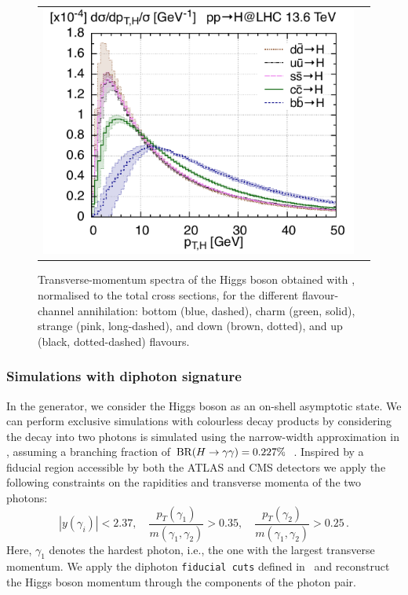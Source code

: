 \documentclass[11pt,a4paper]{article}
\begin{document}
\begin{figure}[t!]
\begin{center}
\begin{tabular}{cc}
\includegraphics[width=.52\textwidth, page=1]{plots/5fs/light/ptHzoom_qqH.pdf}
\end{tabular}
\vspace*{1ex}
\caption{Transverse-momentum spectra of the Higgs boson obtained with \minnlo{}, normalised to the total cross sections, for the different flavour-channel annihilation: bottom (blue, dashed), charm (green, solid), strange (pink, long-dashed), and down (brown, dotted), and  up (black, dotted-dashed) flavours.
\label{fig:lightpTHzoom}}
\end{center}
\end{figure}

\subsubsection{Simulations with diphoton signature}
In the \POWHEG{} generator, we consider the Higgs boson as an on-shell asymptotic state. We can perform exclusive simulations with colourless decay products by considering the decay into two photons is simulated using the narrow-width approximation in , assuming a branching fraction of \({\rm BR}(H \to \gamma\gamma) = 0.227\%\)~\cite{LHCHiggsCrossSectionWorkingGroup:2016ypw}. Inspired by a fiducial region accessible by both the ATLAS and CMS detectors we apply the following constraints on the rapidities and transverse momenta of the two photons:
\begin{equation}
|y(\gamma_i)|< 2.37, \quad
\frac{p_T(\gamma_1)}{m(\gamma_1, \gamma_2)} > 0.35,\quad \frac{p_T(\gamma_2)}{m(\gamma_1, \gamma_2)} > 0.25\,. \label{eq:aafidmycuts}
\end{equation}
Here, \( \gamma_1 \) denotes the hardest photon, i.e., the one with the largest transverse momentum. We apply the diphoton \texttt{fiducial cuts} defined in~ and reconstruct the Higgs boson momentum through the components of the photon pair.
\end{document}

